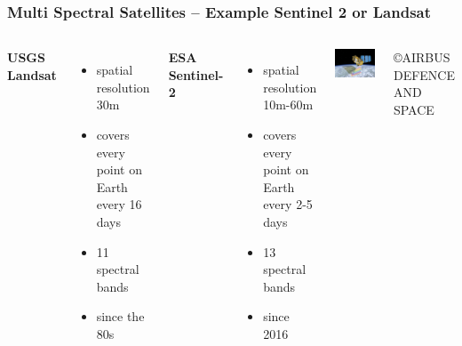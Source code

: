 \begin{frame}
	\frametitle{Multi Spectral Satellites -- Example Sentinel 2 or Landsat}
	
	\begin{columns}[t]
		
		
		
		
		\textbf{USGS Landsat}
		\begin{itemize}
			\item spatial resolution 30m
			\item covers every point on Earth every 16 days
			\item 11 spectral bands
			\item since the 80s
		\end{itemize}
		
		\vspace{2em}
		
		\textbf{ESA Sentinel-2}
		\begin{itemize}
			\item spatial resolution 10m-60m
			\item covers every point on Earth every 2-5 days
			\item 13 spectral bands
			\item since 2016
		\end{itemize}
		
		
		\includegraphics[width=\textwidth]{images/airbus_Sentinel-2_022415_945}
		
		©AIRBUS DEFENCE AND SPACE
	\end{columns}
	
	
	
\end{frame}

